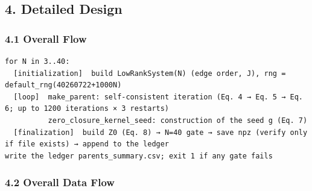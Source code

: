 \documentclass[
  a4paper,
]{ltjsarticle}
\begin{document}
\subsection{4. Detailed Design}\label{detailed-design}

\subsubsection{4.1 Overall Flow}\label{overall-flow}

\begin{verbatim}
for N in 3..40:
  [initialization]  build LowRankSystem(N) (edge order, J), rng = default_rng(40260722+1000N)
  [loop]  make_parent: self-consistent iteration (Eq. 4 → Eq. 5 → Eq. 6; up to 1200 iterations × 3 restarts)
          zero_closure_kernel_seed: construction of the seed g (Eq. 7)
  [finalization]  build Z0 (Eq. 8) → N=40 gate → save npz (verify only if file exists) → append to the ledger
write the ledger parents_summary.csv; exit 1 if any gate fails
\end{verbatim}

\subsubsection{4.2 Overall Data Flow}\label{overall-data-flow}
\end{document}
